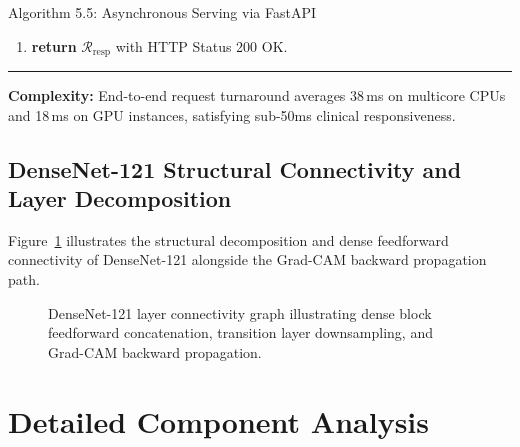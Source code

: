 \documentclass[12pt,a4paper]{report}
\begin{document}
\begin{algoBox}[top=5pt, bottom=5pt, before skip=4pt, after skip=6pt]{Algorithm 5.5: Asynchronous Serving via FastAPI}
\begin{enumerate}[1:]
    \begin{equation*}
    \begin{aligned}
      \mathcal{R}_{\text{resp}} = \big\{ & \texttt{"success"}: \mathrm{true}, \; \texttt{"prediction"}: \hat{c}, \; \texttt{"confidence"}: \mathrm{round}(\kappa, 4), \\
                                         & \texttt{"probabilities"}: \{\text{Normal}\!:\! \hat{y}_1, \, \text{COVID}\!:\! \hat{y}_2, \, \text{Pneum}\!:\! \hat{y}_3\}, \\
                                         & \texttt{"heatmap\_base64"}: \mathbf{B}_{\text{heatmap}}, \; \texttt{"rag\_evidence"}: \mathcal{S}_{\text{rag}}, \\
                                         & \texttt{"latency\_ms"}: \mathrm{round}(\Delta t, 2), \\
                                         & \texttt{"disclaimer"}: \text{``Screening aid only; non-diagnostic.''} \big\}
    \end{aligned}
    \end{equation*}
  \item \textbf{return} $\mathcal{R}_{\text{resp}}$ with HTTP Status 200 OK.
\end{enumerate}
\noindent\rule{\linewidth}{0.4pt}
\textbf{Complexity:} End-to-end request turnaround averages 38\,ms on multicore CPUs and 18\,ms on GPU instances, satisfying sub-50ms clinical responsiveness.
\end{algoBox}

\subsection{DenseNet-121 Structural Connectivity and Layer Decomposition}
Figure~\ref{fig:dag_scheduling_walkthrough} illustrates the structural decomposition and dense feedforward connectivity of DenseNet-121 alongside the Grad-CAM backward propagation path.

\begin{figure}[H]
    \centering
    \caption{DenseNet-121 layer connectivity graph illustrating dense block feedforward concatenation, transition layer downsampling, and Grad-CAM backward propagation.}
    \label{fig:dag_scheduling_walkthrough}
\end{figure}

\section{Detailed Component Analysis}
\end{document}
